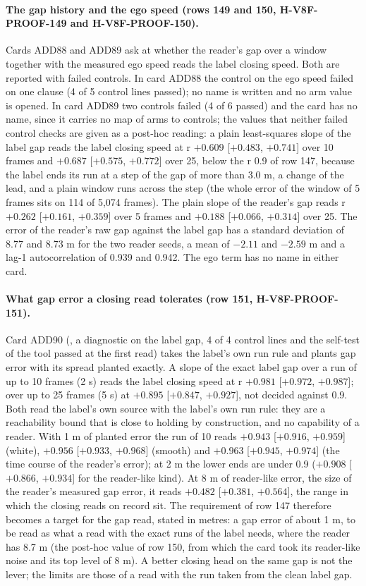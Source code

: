 \paragraph{The gap history and the ego speed (rows 149 and 150, H-V8F-PROOF-149 and H-V8F-PROOF-150).} Cards ADD88 and ADD89 ask at  whether the reader's gap over a window together with the measured ego speed reads the label closing speed. Both are reported with failed controls. In card ADD88 the control on the ego speed failed on one clause (4 of 5 control lines passed); no name is written and no arm value is opened. In card ADD89 two controls failed (4 of 6 passed) and the card has no name, since it carries no map of arms to controls; the values that neither failed control checks are given as a post-hoc reading: a plain least-squares slope of the label gap reads the label closing speed at r $+0.609$ [$+0.483$, $+0.741$] over 10 frames and $+0.687$ [$+0.575$, $+0.772$] over 25, below the r 0.9 of row 147, because the label ends its run at a step of the gap of more than 3.0 m, a change of the lead, and a plain window runs across the step (the whole error of the window of 5 frames sits on 114 of 5,074 frames). The plain slope of the reader's gap reads r $+0.262$ [$+0.161$, $+0.359$] over 5 frames and $+0.188$ [$+0.066$, $+0.314$] over 25. The error of the reader's raw gap against the label gap has a standard deviation of 8.77 and 8.73 m for the two reader seeds, a mean of $-2.11$ and $-2.59$ m and a lag-1 autocorrelation of 0.939 and 0.942. The ego term has no name in either card.

\paragraph{What gap error a closing read tolerates (row 151, H-V8F-PROOF-151).} Card ADD90 (, a diagnostic on the label gap, 4 of 4 control lines and the self-test of the tool passed at the first read) takes the label's own run rule and plants gap error with its spread planted exactly. A slope of the exact label gap over a run of up to 10 frames (2 s) reads the label closing speed at r $+0.981$ [$+0.972$, $+0.987$]; over up to 25 frames (5 s) at $+0.895$ [$+0.847$, $+0.927$], not decided against 0.9. Both read the label's own source with the label's own run rule: they are a reachability bound that is close to holding by construction, and no capability of a reader. With 1 m of planted error the run of 10 reads $+0.943$ [$+0.916$, $+0.959$] (white), $+0.956$ [$+0.933$, $+0.968$] (smooth) and $+0.963$ [$+0.945$, $+0.974$] (the time course of the reader's error); at 2 m the lower ends are under 0.9 ($+0.908$ [$+0.866$, $+0.934$] for the reader-like kind). At 8 m of reader-like error, the size of the reader's measured gap error, it reads $+0.482$ [$+0.381$, $+0.564$], the range in which the closing reads on record sit. The requirement of row 147 therefore becomes a target for the gap read, stated in metres: a gap error of about 1 m, to be read as what a read with the exact runs of the label needs, where the reader has 8.7 m (the post-hoc value of row 150, from which the card took its reader-like noise and its top level of 8 m). A better closing head on the same gap is not the lever; the limits are those of a  read with the run taken from the clean label gap.
